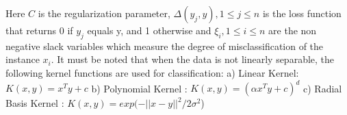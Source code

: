 \documentclass[10pt, conference, compsocconf]{IEEEtran}
\begin{document}
\begin{enumerate}
Here $C$ is the regularization parameter, $\Delta(y_{j},y), 1 \le j \le n$ is the loss function that returns 0 if $y_{j}$ equals y, and 1 otherwise and $\xi_{i}, 1 \le i \le n$ are the non negative slack variables which measure the degree of misclassification of the instance $x_{i}$. 
It must be noted that when the data is not linearly separable, the following kernel functions are used for classification:
a) Linear Kernel: $K(x,y) = x^{T}y + c $
b) Polynomial Kernel : $K(x,y) = (\alpha x^{T}y + c)^{d}$
c) Radial Basis Kernel : $K(x,y) = exp(-\lvert \lvert x-y\rvert\rvert^{2}/2\sigma^{2}$)



\end{enumerate}
\end{document}
